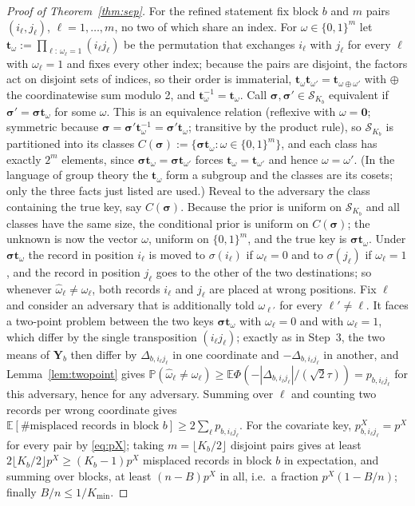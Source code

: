 \documentclass[11pt]{article}
\theoremstyle{definition}
\newcommand{\bY}{\mathbf{Y}}
\newcommand{\bzero}{\mathbf{0}}
\newcommand{\bsigma}{\boldsymbol{\sigma}}
\newcommand{\E}{\mathbb{E}}
\newcommand{\Prob}{\mathbb{P}}
\newcommand{\calS}{\mathcal{S}}
\begin{document}
\begin{proof}[Proof of Theorem~\ref{thm:sep}]
For the refined statement fix block $b$ and $m$ pairs $(i_\ell,j_\ell)$, $\ell=1,\dots,m$, no two of which share an index. For $\omega\in\{0,1\}^m$ let $\bm t_\omega:=\prod_{\ell:\,\omega_\ell=1}(i_\ell j_\ell)$ be the permutation that exchanges $i_\ell$ with $j_\ell$ for every $\ell$ with $\omega_\ell=1$ and fixes every other index; because the pairs are disjoint, the factors act on disjoint sets of indices, so their order is immaterial, $\bm t_\omega\bm t_{\omega'}=\bm t_{\omega\oplus\omega'}$ with $\oplus$ the coordinatewise sum modulo 2, and $\bm t_\omega^{-1}=\bm t_\omega$. Call $\bsigma,\bsigma'\in\calS_{K_b}$ equivalent if $\bsigma'=\bsigma\bm t_\omega$ for some $\omega$. This is an equivalence relation (reflexive with $\omega=\bzero$; symmetric because $\bsigma=\bsigma'\bm t_\omega^{-1}=\bsigma'\bm t_\omega$; transitive by the product rule), so $\calS_{K_b}$ is partitioned into its classes $C(\bsigma):=\{\bsigma\bm t_\omega:\omega\in\{0,1\}^m\}$, and each class has exactly $2^m$ elements, since $\bsigma\bm t_\omega=\bsigma\bm t_{\omega'}$ forces $\bm t_\omega=\bm t_{\omega'}$ and hence $\omega=\omega'$. (In the language of group theory the $\bm t_\omega$ form a subgroup and the classes are its cosets; only the three facts just listed are used.) Reveal to the adversary the class containing the true key, say $C(\bsigma)$. Because the prior is uniform on $\calS_{K_b}$ and all classes have the same size, the conditional prior is uniform on $C(\bsigma)$; the unknown is now the vector $\omega$, uniform on $\{0,1\}^m$, and the true key is $\bsigma\bm t_\omega$. Under $\bsigma\bm t_\omega$ the record in position $i_\ell$ is moved to $\sigma(i_\ell)$ if $\omega_\ell=0$ and to $\sigma(j_\ell)$ if $\omega_\ell=1$, and the record in position $j_\ell$ goes to the other of the two destinations; so whenever $\hat\omega_\ell\ne\omega_\ell$, both records $i_\ell$ and $j_\ell$ are placed at wrong positions. Fix $\ell$ and consider an adversary that is additionally told $\omega_{\ell'}$ for every $\ell'\ne\ell$. It faces a two-point problem between the two keys $\bsigma\bm t_\omega$ with $\omega_\ell=0$ and with $\omega_\ell=1$, which differ by the single transposition $(i_\ell j_\ell)$; exactly as in Step~3, the two means of $\bY_b$ then differ by $\Delta_{b,i_\ell j_\ell}$ in one coordinate and $-\Delta_{b,i_\ell j_\ell}$ in another, and Lemma~\ref{lem:twopoint} gives $\Prob(\hat\omega_\ell\ne\omega_\ell)\ge\E\Phi(-|\Delta_{b,i_\ell j_\ell}|/(\sqrt2\tau))=p_{b,i_\ell j_\ell}$ for this adversary, hence for any adversary. Summing over $\ell$ and counting two records per wrong coordinate gives $\E[\#\text{misplaced records in block }b]\ge2\sum_\ell p_{b,i_\ell j_\ell}$. For the covariate key, $p^X_{b,i_\ell j_\ell}=p^X$ for every pair by \eqref{eq:pX}; taking $m=\lfloor K_b/2\rfloor$ disjoint pairs gives at least $2\lfloor K_b/2\rfloor p^X\ge(K_b-1)p^X$ misplaced records in block $b$ in expectation, and summing over blocks, at least $(n-B)p^X$ in all, i.e.\ a fraction $p^X(1-B/n)$; finally $B/n\le1/K_{\min}$.


\end{proof}
\end{document}
